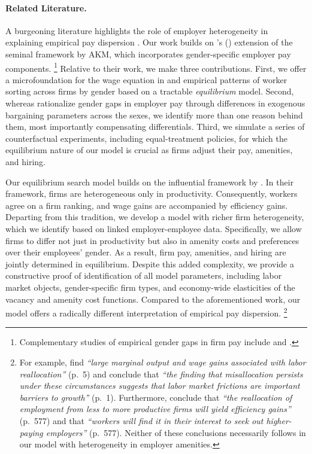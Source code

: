\paragraph{Related Literature.}

A burgeoning literature highlights the role of employer heterogeneity in explaining empirical pay dispersion \citep{CardHeiningKline2013, AlvarezBenguriaEngbomMoser2018, SongPriceGuvenenBloomvonWachter2018, GerardLagosSeverniniCard2021}. Our work builds on \citeauthor{CardCardosoKline2016}'s (\citeyear{CardCardosoKline2016}) extension of the seminal framework by AKM, which incorporates gender-specific employer pay components.%
%
\footnote{Complementary studies of empirical gender gaps in firm pay include \citet{Sorkin2017} and \citet{Palladinoetal2025}.} %
%
Relative to their work, we make three contributions. %
%
First, we offer a microfoundation for the wage equation in \citet{CardCardosoKline2016} and empirical patterns of worker sorting across firms by gender based on a tractable \emph{equilibrium} model. %
%
Second, whereas \citet{CardCardosoKline2016} rationalize gender gaps in employer pay through differences in exogenous bargaining parameters across the sexes, we identify more than one reason behind them, most importantly compensating differentials. %
%
Third, we simulate a series of counterfactual experiments, including equal-treatment policies, for which the equilibrium nature of our model is crucial as firms adjust their pay, amenities, and hiring.

Our equilibrium search model builds on the influential framework by \citet{BurdettMortensen1998}. In their framework, firms are heterogeneous only in productivity. Consequently, workers agree on a firm ranking, and wage gains are accompanied by efficiency gains. Departing from this tradition, we develop a model with richer firm heterogeneity, which we identify based on linked employer-employee data. Specifically, we allow firms to differ not just in productivity but also in amenity costs and preferences over their employees' gender. As a result, firm pay, amenities, and hiring are jointly determined in equilibrium. Despite this added complexity, we provide a constructive proof of identification of all model parameters, including labor market objects, gender-specific firm types, and economy-wide elasticities of the vacancy and amenity cost functions. Compared to the aforementioned work, our model offers a radically different interpretation of empirical pay dispersion.%
%
\footnote{For example, \citet{BaggerChristensenMortensen2014} find \emph{``large marginal output and wage gains associated with labor reallocation''} (p.\ 5) and conclude that \emph{``the finding that misallocation persists under these circumstances suggests that labor market frictions are important barriers to growth''} (p.\ 1). Furthermore, \citet{LentzMortensen2010} conclude that \emph{``the reallocation of employment from less to more productive firms will yield efficiency gains''} (p.\ 577) and that \emph{``workers will find it in their interest to seek out higher-paying employers''} (p.\ 577). Neither of these conclusions necessarily follows in our model with heterogeneity in employer amenities.} %
%


